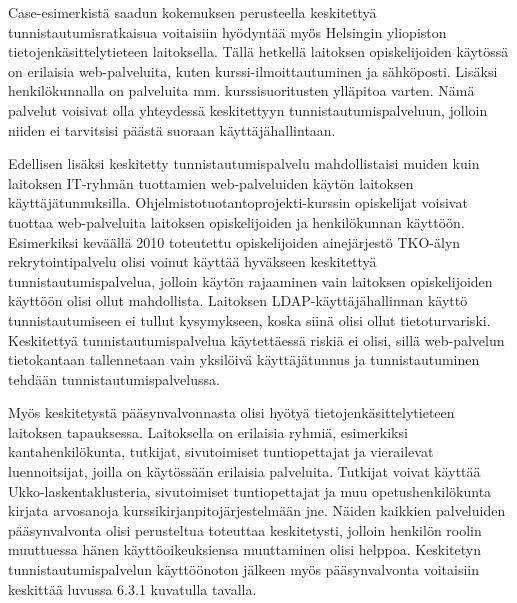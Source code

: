 Case-esimerkistä saadun kokemuksen perusteella keskitettyä tunnistautumisratkaisua voitaisiin hyödyntää myös Helsingin yliopiston tietojenkäsittelytieteen laitoksella. Tällä hetkellä laitoksen opiskelijoiden käytössä on erilaisia web-palveluita, kuten kurssi-ilmoittautuminen ja sähköposti. Lisäksi henkilökunnalla on palveluita mm. kurssisuoritusten ylläpitoa varten. Nämä palvelut voisivat olla yhteydessä keskitettyyn tunnistautumispalveluun, jolloin niiden ei tarvitsisi päästä suoraan käyttäjähallintaan.

Edellisen lisäksi keskitetty tunnistautumispalvelu mahdollistaisi muiden kuin laitoksen IT-ryhmän tuottamien web-palveluiden käytön laitoksen käyttäjätunnuksilla. Ohjelmistotuotantoprojekti-kurssin opiskelijat voisivat tuottaa web-palveluita laitoksen opiskelijoiden ja henkilökunnan käyttöön. Esimerkiksi keväällä 2010 toteutettu opiskelijoiden ainejärjestö TKO-älyn rekrytointipalvelu olisi voinut käyttää hyväkseen keskitettyä tunnistautumispalvelua, jolloin käytön rajaaminen vain laitoksen opiskelijoiden käyttöön olisi ollut mahdollista. Laitoksen LDAP-käyt\-tä\-jä\-hal\-lin\-nan käyttö tunnistautumiseen ei tullut kysymykseen, koska siinä olisi ollut tietoturvariski. Keskitettyä tunnistautumispalvelua käytettäessä riskiä ei olisi, sillä web-palvelun tietokantaan tallennetaan vain yksilöivä käyttäjätunnus ja tunnistautuminen tehdään tunnistautumispalvelussa.

Myös keskitetystä pääsynvalvonnasta olisi hyötyä tietojenkäsittelytieteen laitoksen tapauksessa. Laitoksella on erilaisia ryhmiä, esimerkiksi kantahenkilökunta, tutkijat, sivutoimiset tuntiopettajat ja vierailevat luennoitsijat, joilla on käytössään erilaisia palveluita. Tutkijat voivat käyttää Ukko-laskentaklusteria, sivutoimiset tuntiopettajat ja muu opetushenkilökunta kirjata arvosanoja kurssikirjanpitojärjestelmään jne. Näiden kaikkien palveluiden pääsynvalvonta olisi perusteltua toteuttaa keskitetysti, jolloin henkilön roolin muuttuessa hänen käyttöoikeuksiensa muuttaminen olisi helppoa. Keskitetyn tunnistautumispalvelun käyttöönoton jälkeen myös pääsynvalvonta voitaisiin keskittää luvussa 6.3.1 kuvatulla tavalla.